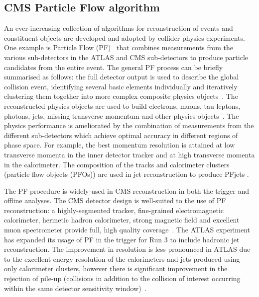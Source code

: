 \subsection{CMS Particle Flow algorithm} \label{sec:Algorithms}

An ever-increasing collection of algorithms for reconstruction of events and constituent objects are developed and adopted by collider physics experiments. One example is Particle Flow (PF)~\cite{sirunyan2017pflowcms} that combines measurements from the various sub-detectors in the ATLAS and CMS sub-detectors to produce particle candidates from the entire event. The general PF process can be briefly summarised as follows: the full detector output is used to describe the global collision event, identifying several basic elements individually and iteratively clustering them together into more complex composite physics objects~\cite{CMS:2020uim,CMS:2018rym,CMS:2014pgm}. The reconstructed physics objects are used to build electrons, muons, tau leptons, photons, jets, missing transverse momentum and other physics objects~\cite{CMS:2018jrd,CMS:2016lmd,CMS:2019ctu}. The physics performance is ameliorated by the combination of measurements from the different sub-detectors which achieve optimal accuracy in different regions of phase space. For example, the best momentum resolution is attained at low transverse momenta in the inner detector tracker and at high transverse momenta in the calorimeter. The composition of the tracks and calorimeter clusters (particle flow objects (PFOs)) are used in jet reconstruction to produce PFjets .

The PF procedure is widely-used in CMS reconstruction in both the trigger and offline analyses. The CMS detector design is well-suited to the use of PF reconstruction: a highly-segmented tracker, fine-grained electromagnetic calorimeter, hermetic hadron calorimeter, strong magnetic field and excellent muon spectrometer provide full, high quality coverage~\cite{sirunyan2017pflowcms}. The ATLAS experiment has expanded its usage of PF in the trigger for Run 3 to include hadronic jet reconstruction. The improvement in resolution is less pronounced in ATLAS due to the excellent energy resolution of the calorimeters and jets produced using only calorimeter clusters, however there is significant improvement in the rejection of pile-up (collisions in addition to the collision of interest occurring within the same detector sensitivity window)~\cite{ATLASTriggerRun3,ATLASJetPFlow}. 

